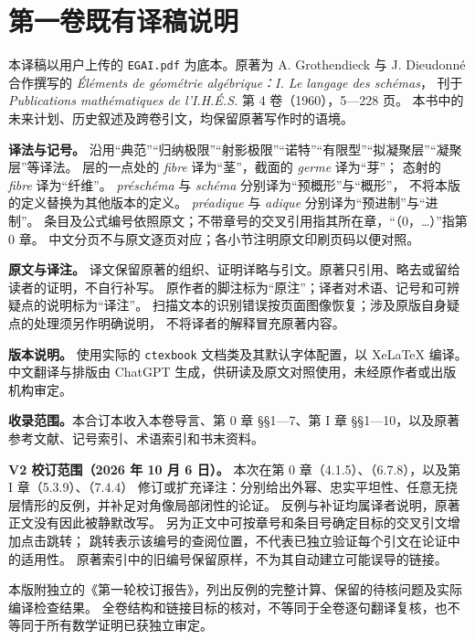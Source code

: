 \chapter*{第一卷既有译稿说明}
本译稿以用户上传的 \texttt{EGAI.pdf} 为底本。原著为 A. Grothendieck 与 J. Dieudonné
合作撰写的 \textit{Éléments de géométrie algébrique：I. Le langage des schémas}，
刊于 \textit{Publications mathématiques de l'I.H.É.S.} 第 4 卷（1960），5—228 页。
本书中的未来计划、历史叙述及跨卷引文，均保留原著写作时的语境。

\medskip
\noindent\textbf{译法与记号。}
沿用“典范”“归纳极限”“射影极限”“诺特”“有限型”“拟凝聚层”“凝聚层”等译法。
层的一点处的 \textit{fibre} 译为“茎”，截面的 \textit{germe} 译为“芽”；
态射的 \textit{fibre} 译为“纤维”。
\textit{préschéma} 与 \textit{schéma} 分别译为“预概形”与“概形”，
不将本版的定义替换为其他版本的定义。
\textit{préadique} 与 \textit{adique} 分别译为“预进制”与“进制”。
条目及公式编号依照原文；不带章号的交叉引用指其所在章，“（0，…）”指第 0 章。
中文分页不与原文逐页对应；各小节注明原文印刷页码以便对照。

\medskip
\noindent\textbf{原文与译注。}
译文保留原著的组织、证明详略与引文。原著只引用、略去或留给读者的证明，不自行补写。
原作者的脚注标为“原注”；译者对术语、记号和可辨疑点的说明标为“译注”。
扫描文本的识别错误按页面图像恢复；涉及原版自身疑点的处理须另作明确说明，
不将译者的解释冒充原著内容。

\medskip
\noindent\textbf{版本说明。}
使用实际的 \texttt{ctexbook} 文档类及其默认字体配置，以 XeLaTeX 编译。
中文翻译与排版由 ChatGPT 生成，供研读及原文对照使用，未经原作者或出版机构审定。
\par\medskip\noindent\textbf{收录范围。}本合订本收入本卷导言、第 0 章 §§1—7、第 I 章 §§1—10，以及原著参考文献、记号索引、术语索引和书末资料。


\medskip
\noindent\textbf{V2 校订范围（2026 年 10 月 6 日）。}
本次在第 0 章（4.1.5）、（6.7.8），以及第 I 章（5.3.9）、（7.4.4）
修订或扩充译注：分别给出外幂、忠实平坦性、任意无挠层情形的反例，并补足对角像局部闭性的论证。
反例与补证均属译者说明，原著正文没有因此被静默改写。
另为正文中可按章号和条目号确定目标的交叉引文增加点击跳转；
跳转表示该编号的查阅位置，不代表已独立验证每个引文在论证中的适用性。
原著索引中的旧编号保留原样，不为其自动建立可能误导的链接。

本版附独立的《第一轮校订报告》，列出反例的完整计算、保留的待核问题及实际编译检查结果。
全卷结构和链接目标的核对，不等同于全卷逐句翻译复核，也不等同于所有数学证明已获独立审定。




